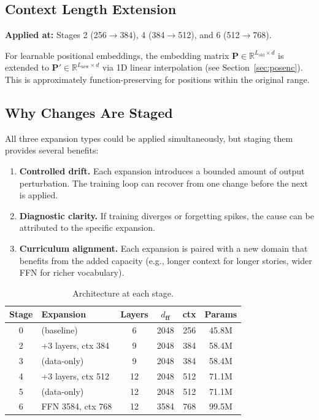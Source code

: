 \subsection{Context Length Extension}

\textbf{Applied at:} Stages 2 (256$\to$384), 4 (384$\to$512), and 6
(512$\to$768).

For learnable positional embeddings, the embedding matrix
$\mathbf{P} \in \mathbb{R}^{L_\text{old} \times d}$ is extended to
$\mathbf{P}' \in \mathbb{R}^{L_\text{new} \times d}$ via 1D linear
interpolation (see Section~\ref{sec:posenc}).  This is approximately
function-preserving for positions within the original range.

\subsection{Why Changes Are Staged}

All three expansion types could be applied simultaneously, but staging them
provides several benefits:
\begin{enumerate}[nosep]
  \item \textbf{Controlled drift.}  Each expansion introduces a bounded amount
        of output perturbation.  The training loop can recover from one change
        before the next is applied.
  \item \textbf{Diagnostic clarity.}  If training diverges or forgetting spikes,
        the cause can be attributed to the specific expansion.
  \item \textbf{Curriculum alignment.}  Each expansion is paired with a new
        domain that benefits from the added capacity (e.g., longer context for
        longer stories, wider FFN for richer vocabulary).
\end{enumerate}

\begin{table}[H]
\centering\small
\caption{Architecture at each stage.}
\begin{tabular}{clcccc}
\toprule
\textbf{Stage} & \textbf{Expansion} & \textbf{Layers} & $d_\textbf{ff}$ &
\textbf{ctx} & \textbf{Params} \\
\midrule
0 & (baseline)                   & 6  & 2048 & 256 & 45.8M \\
2 & +3 layers, ctx 384           & 9  & 2048 & 384 & 58.4M \\
3 & (data-only)                  & 9  & 2048 & 384 & 58.4M \\
4 & +3 layers, ctx 512           & 12 & 2048 & 512 & 71.1M \\
5 & (data-only)                  & 12 & 2048 & 512 & 71.1M \\
6 & FFN 3584, ctx 768            & 12 & 3584 & 768 & 99.5M \\
\bottomrule
\end{tabular}
\label{tab:stages}
\end{table}
